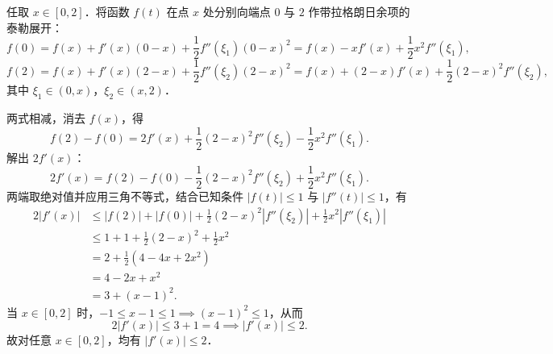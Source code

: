 \begin{myproof}
    任取 $x \in [0, 2]$．将函数 $f(t)$ 在点 $x$ 处分别向端点 $0$ 与 $2$ 作带拉格朗日余项的泰勒展开：
    \begin{equation}
        f(0) = f(x) + f'(x)(0 - x) + \frac{1}{2}f''(\xi_1)(0 - x)^2 = f(x) - x f'(x) + \frac{1}{2}x^2 f''(\xi_1),
    \end{equation}
    \begin{equation}
        f(2) = f(x) + f'(x)(2 - x) + \frac{1}{2}f''(\xi_2)(2 - x)^2 = f(x) + (2 - x)f'(x) + \frac{1}{2}(2 - x)^2 f''(\xi_2),
    \end{equation}
    其中 $\xi_1 \in (0, x)$，$\xi_2 \in (x, 2)$．

    两式相减，消去 $f(x)$，得
    \begin{equation}
        f(2) - f(0) = 2f'(x) + \frac{1}{2}(2 - x)^2 f''(\xi_2) - \frac{1}{2}x^2 f''(\xi_1).
    \end{equation}
    解出 $2f'(x)$：
    \begin{equation}
        2f'(x) = f(2) - f(0) - \frac{1}{2}(2 - x)^2 f''(\xi_2) + \frac{1}{2}x^2 f''(\xi_1).
    \end{equation}
    两端取绝对值并应用三角不等式，结合已知条件 $|f(t)| \leqslant 1$ 与 $|f''(t)| \leqslant 1$，有
    \begin{equation}
        \begin{aligned}
            2|f'(x)| & \leqslant |f(2)| + |f(0)| + \frac{1}{2}(2 - x)^2 |f''(\xi_2)| + \frac{1}{2}x^2 |f''(\xi_1)| \\
                     & \leqslant 1 + 1 + \frac{1}{2}(2 - x)^2 + \frac{1}{2}x^2                                     \\
                     & = 2 + \frac{1}{2}(4 - 4x + 2x^2)                                                            \\
                     & = 4 - 2x + x^2                                                                              \\
                     & = 3 + (x - 1)^2.
        \end{aligned}
    \end{equation}
    当 $x \in [0, 2]$ 时，$-1 \leqslant x - 1 \leqslant 1 \implies (x - 1)^2 \leqslant 1$，从而
    \begin{equation}
        2|f'(x)| \leqslant 3 + 1 = 4 \implies |f'(x)| \leqslant 2.
    \end{equation}
    故对任意 $x \in [0, 2]$，均有 $|f'(x)| \leqslant 2$．
\end{myproof}

